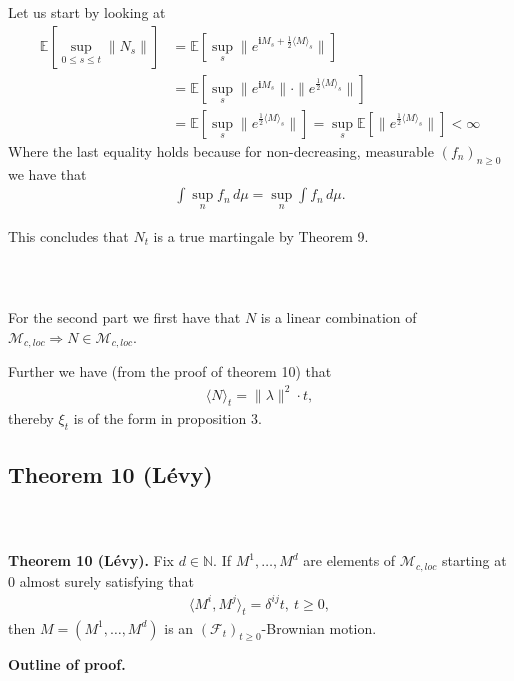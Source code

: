 \documentclass{beamer}
\numberwithin{equation}{section}
\newenvironment{frame2}{\begin{frame}\frametitle{{\normalsize \secname} \\ {\large \subsecname}}}{\end{frame}}
\begin{document}
\begin{frame2}
    Let us start by looking at
    \begin{align*}
        \mathbb{E}\left[\sup_{0 \leq s \leq t} \| N_s \| \right] &= \mathbb{E}\left[\sup_s \| e^{\textbf{i}M_s + \frac{1}{2}\langle M \rangle_s} \|\right]\\
        &= \mathbb{E}\left[\sup_s \| e^{\textbf{i}M_s} \| \cdot \|e^{\frac{1}{2}\langle M \rangle_s} \|\right] \\
         &= \mathbb{E}\left[\sup_s \|e^{\frac{1}{2}\langle M \rangle_s}\|\right] = \sup_s \mathbb{E}\left[ \|e^{\frac{1}{2}\langle M \rangle_s} \|\right] < \infty
    \end{align*}
    Where the last equality holds because for non-decreasing, measurable $(f_n)_{n\geq 0}$ we have that
    \begin{align*}
        \int \sup_{n} f_n \, d \mu = \sup_{n} \int f_n \, d \mu. 
    \end{align*}

    \vspace{10pt}
    This concludes that $N_t$ is a true martingale by Theorem 9. 
\end{frame2}

\begin{frame2}
    For the second part we first have that $N$ is a linear combination of $\mathcal{M}_{c,loc} \Rightarrow N \in \mathcal{M}_{c,loc}$.
    
    \vspace{10pt}
    Further we have (from the proof of theorem 10) that
    \begin{align}
        \langle N \rangle_t = \| \lambda \|^2 \cdot t,
    \end{align}
    thereby $\xi_t$ is of the form in proposition 3.
\end{frame2}

\subsection{Theorem 10 (Lévy)}

\begin{frame2}
    \textbf{Theorem 10 (Lévy).}
    Fix $d \in \mathbb{N}$.
    If $M^1,\ldots,M^d$ are elements of $\mathcal{M}_{c,loc}$ starting at 0 almost surely satisfying that
    \begin{align}
        \langle M^i,M^j \rangle_t = \delta^{ij}t, \ t \geq 0,
    \end{align}
    then $M = (M^1, \ldots, M^d)$ is an $(\mathcal{F}_t)_{t \geq 0}$-Brownian motion.
    
    \vspace{10pt}
    \textbf{Outline of proof.}
\end{frame2}
\end{document}
